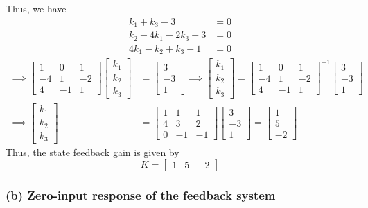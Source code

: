 Thus, we have
\begin{align*}
    k_1 + k_3 - 3         & = 0 \\
    k_2 - 4k_1 - 2k_3 + 3 & = 0 \\
    4k_1 - k_2 + k_3 - 1  & = 0
\end{align*}
\begin{align*}
    \implies
    \begin{bmatrix}
        1  & 0  & 1  \\
        -4 & 1  & -2 \\
        4  & -1 & 1
    \end{bmatrix}
    \begin{bmatrix}
        k_1 \\
        k_2 \\
        k_3
    \end{bmatrix}
     & =
    \begin{bmatrix}
        3  \\
        -3 \\
        1
    \end{bmatrix}
    \implies
    \begin{bmatrix}
        k_1 \\
        k_2 \\
        k_3
    \end{bmatrix}
    =
    \begin{bmatrix}
        1  & 0  & 1  \\
        -4 & 1  & -2 \\
        4  & -1 & 1
    \end{bmatrix}^{-1}
    \begin{bmatrix}
        3  \\
        -3 \\
        1
    \end{bmatrix}
    \\
    \implies
    \begin{bmatrix}
        k_1 \\
        k_2 \\
        k_3
    \end{bmatrix}
     & =
    \begin{bmatrix}
        1 & 1  & 1  \\
        4 & 3  & 2  \\
        0 & -1 & -1
    \end{bmatrix}
    \begin{bmatrix}
        3  \\
        -3 \\
        1
    \end{bmatrix}
    =
    \begin{bmatrix}
        1 \\
        5 \\
        -2
    \end{bmatrix}
\end{align*}
Thus, the state feedback gain is given by
\begin{equation*}
    \boxed{
        K
        =
        \begin{bmatrix}
            1 & 5 & -2
        \end{bmatrix}
    }
\end{equation*}

\subsubsection*{(b) Zero-input response of the feedback system}
